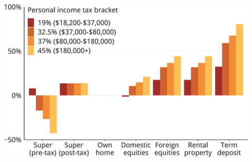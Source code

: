 \documentclass[tikz]{standalone}\usepackage[]{graphicx}\usepackage[]{color}
\newenvironment{knitrout}{}{} %
\begin{document}
\begin{knitrout}
\color{fgcolor}
\includegraphics[width=11.000in,height=7.00in]{./Super-tax-targeting/b5-super-atlas/Figure2-3-1} 

\end{knitrout}
\end{document}
